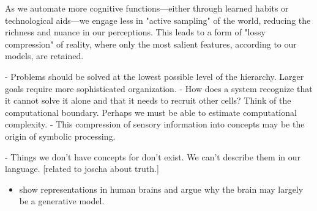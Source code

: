 As we automate more cognitive functions—either through learned habits or technological aids—we engage less in "active sampling" of the world, reducing the richness and nuance in our perceptions. This leads to a form of "lossy compression" of reality, where only the most salient features, according to our models, are retained.


- Problems should be solved at the lowest possible level of the hierarchy. Larger goals require more sophisticated organization.
- How does a system recognize that it cannot solve it alone and that it needs to recruit other cells? Think of the computational boundary. Perhaps we must be able to estimate computational complexity. 
- This compression of sensory information into concepts may be the origin of symbolic processing. 

- Things we don't have concepts for don't exist. We can't describe them in our language. [related to joscha about truth.] 






\begin{itemize}
    \item show representations in human brains and argue why the brain may largely be a generative model. 
\end{itemize}

